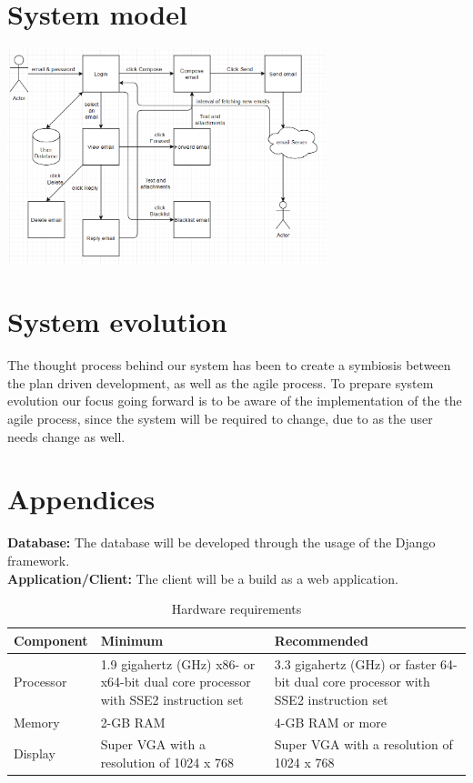 \documentclass{article}
\begin{document}
\section*{System model}
\vspace{8 mm}

\includegraphics[width=350px, keepaspectratio]{Dataflowchart.png}\\[1cm]

\section*{System evolution}
The thought process behind our system has been to create a symbiosis between the plan driven development, as well as the agile process. To prepare system evolution our focus going forward is to be aware of the implementation of the the agile process, since the system will be required to change, due to  as the user needs change as well. 

\newpage

\section*{Appendices}
\textbf{Database:} The database will be developed through the usage of the Django framework.
\\
\textbf{Application/Client:} The client will be a build as a web application.

\begin{table}[h]
\centering
    \caption{Hardware requirements} 
    \label{crouch}
    \begin{tabular}{  l  p{3.4cm}  p{3.4cm} }
        \toprule
\textbf{Component}      
& \textbf{Minimum}   
& \textbf{Recommended} \\\midrule
Processor
& 1.9 gigahertz (GHz) x86- or x64-bit dual core processor with SSE2 instruction set        
& 3.3 gigahertz (GHz) or faster 64-bit dual core processor with SSE2 instruction set \\\hline
Memory       
& 2-GB RAM                         
& 4-GB RAM or more  \\\hline
Display       
& Super VGA with a resolution of 1024 x 768 
& Super VGA with a resolution of 1024 x 768 \\
        \bottomrule
    \end{tabular}
\end{table}
\end{document}
